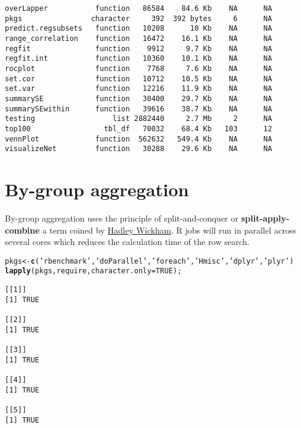 \documentclass[9pt,english]{extarticle}\usepackage[]{graphicx}\usepackage[]{color}
\makeatletter
\newcommand{\hlnum}[1]{\textcolor[rgb]{0.686,0.059,0.569}{#1}}%
\newcommand{\hlstr}[1]{\textcolor[rgb]{0.192,0.494,0.8}{#1}}%
\newcommand{\hlstd}[1]{\textcolor[rgb]{0.345,0.345,0.345}{#1}}%
\newcommand{\hlkwb}[1]{\textcolor[rgb]{0.69,0.353,0.396}{#1}}%
\newcommand{\hlkwc}[1]{\textcolor[rgb]{0.333,0.667,0.333}{#1}}%
\newcommand{\hlkwd}[1]{\textcolor[rgb]{0.737,0.353,0.396}{\textbf{#1}}}%
\newenvironment{kframe}{%
 \def\at@end@of@kframe{}%
 \ifinner\ifhmode%
  \def\at@end@of@kframe{\end{minipage}}%
  \begin{minipage}{\columnwidth}%
 \fi\fi%
 \def\FrameCommand##1{\hskip\@totalleftmargin \hskip-\fboxsep
 \colorbox{shadecolor}{##1}\hskip-\fboxsep
     \hskip-\linewidth \hskip-\@totalleftmargin \hskip\columnwidth}%
 \MakeFramed {\advance\hsize-\width
   \@totalleftmargin\z@ \linewidth\hsize
   \@setminipage}}%
 {\par\unskip\endMakeFramed%
 \at@end@of@kframe}
\newenvironment{knitrout}{}{} %
\makeatother
\begin{document}
\begin{linenumbers}
\begin{knitrout}
\begin{kframe}
\begin{verbatim}
overLapper           function   86584    84.6 Kb    NA      NA
pkgs                character     392  392 bytes     6      NA
predict.regsubsets   function   10208      10 Kb    NA      NA
range_correlation    function   16472    16.1 Kb    NA      NA
regfit               function    9912     9.7 Kb    NA      NA
regfit.int           function   10360    10.1 Kb    NA      NA
rocplot              function    7768     7.6 Kb    NA      NA
set.cor              function   10712    10.5 Kb    NA      NA
set.var              function   12216    11.9 Kb    NA      NA
summarySE            function   30400    29.7 Kb    NA      NA
summarySEwithin      function   39616    38.7 Kb    NA      NA
testing                  list 2882440     2.7 Mb     2      NA
top100                 tbl_df   70032    68.4 Kb   103      12
vennPlot             function  562632   549.4 Kb    NA      NA
visualizeNet         function   30288    29.6 Kb    NA      NA
\end{verbatim}
\end{kframe}
\end{knitrout}

\section{By-group aggregation}
\label{sec:aggregation}

By-group aggregation uses the principle of split-and-conquer or \textbf{split-apply-combine} a term coined by \href{http://goo.gl/qZIQ8I}{Hadley Wickham}. R jobs will run in parallel across several cores which reduces the calculation time of the row search. 


\begin{knitrout}
\color{fgcolor}\begin{kframe}
\begin{alltt}
\hlstd{pkgs} \hlkwb{<-} \hlkwd{c}\hlstd{(}\hlstr{'rbenchmark'}\hlstd{,} \hlstr{'doParallel'}\hlstd{,} \hlstr{'foreach'}\hlstd{,} \hlstr{'Hmisc'}\hlstd{,} \hlstr{'dplyr'}\hlstd{,} \hlstr{'plyr'}\hlstd{)}
\hlkwd{lapply}\hlstd{(pkgs, require,} \hlkwc{character.only} \hlstd{=} \hlnum{TRUE}\hlstd{);}
\end{alltt}
\begin{verbatim}
[[1]]
[1] TRUE

[[2]]
[1] TRUE

[[3]]
[1] TRUE

[[4]]
[1] TRUE

[[5]]
[1] TRUE


\end{verbatim}
\end{kframe}
\end{knitrout}
\end{linenumbers}
\end{document}
